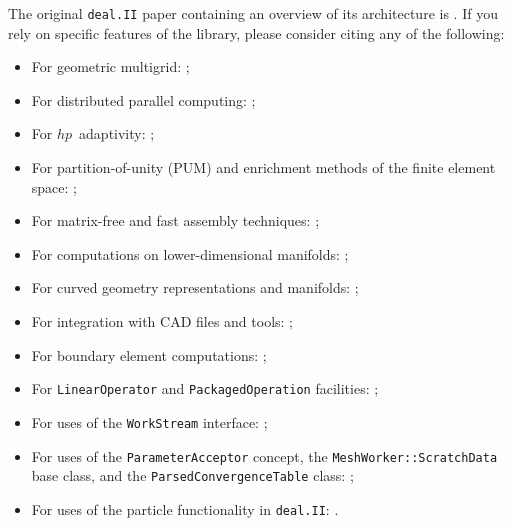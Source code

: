 \documentclass{ansarticle-preprint}
\newcommand{\specialword}[1]{\texttt{#1}}
\newcommand{\dealii}{{\specialword{deal.II}}\xspace}
\begin{document}
The original \dealii{} paper containing an overview of its
architecture is \cite{BangerthHartmannKanschat2007}. If you rely on
specific features of the library, please consider citing any of the
following:
\begin{multicols}{2}
  \vspace*{-36pt}
  \begin{itemize}
 \item For geometric multigrid: \cite{Kanschat2004,JanssenKanschat2011,ClevengerHeisterKanschatKronbichler2019};
 \item For distributed parallel computing: \cite{BangerthBursteddeHeisterKronbichler11};
 \item For $hp$~adaptivity: \cite{BangerthKayserHerold2007};
  \item For partition-of-unity (PUM) and enrichment methods of the
    finite element space: \cite{Davydov2016};
 \item For matrix-free and fast assembly techniques:
   \cite{KronbichlerKormann2012,KronbichlerKormann2019};
 \item For computations on lower-dimensional manifolds:
   \cite{DeSimoneHeltaiManigrasso2009};
 \item For curved geometry representations and manifolds:
   \cite{HeltaiBangerthKronbichlerMola2019};
   \vfill\null  \columnbreak
 \item For integration with CAD files and tools:
   \cite{HeltaiMola2015};
 \item For boundary element computations:
   \cite{GiulianiMolaHeltai-2018-a};
 \item For \texttt{LinearOperator} and \texttt{PackagedOperation} facilities:
   \cite{MaierBardelloniHeltai-2016-a,MaierBardelloniHeltai-2016-b};
 \item For uses of the \texttt{WorkStream} interface:
   \cite{TKB16};
 \item For uses of the \texttt{ParameterAcceptor} concept, the
   \texttt{MeshWorker::ScratchData} base class, and the
   \texttt{ParsedConvergenceTable} class:
   \cite{SartoriGiulianiBardelloni-2018-a};
 \item For uses of the particle functionality in \dealii{}:
   \cite{GLHPB18}.
   \vfill\null  
\end{itemize}
\end{multicols}
\end{document}
